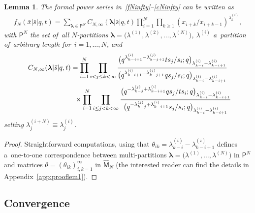 \documentclass[11pt]{article}
\numberwithin{equation}{section}
\newtheorem{Lemma}[Theorem]{Lemma}
\newcommand{\vlam}{\boldsymbol{\lambda}}
\newcommand{\bx}{\bar{x}}
\newcommand{\bs}{\bar{s}}
\begin{document}
\setcounter{section}{3}
\setcounter{subsection}{1}
\setcounter{subsubsection}{0}
\setcounter{Theorem}{4}
\setcounter{equation}{7}
\begin{Lemma}
\label{lem1}
The formal power series in~\eqref{fNinfty}--\eqref{cNinfty} can be written as
\begin{gather}
\label{fNinfty1}
 f_N(\bx|\bs|q,t) = \sum_{\vlam\in\mathsf{P}^N} C_{N,\infty}(\vlam|\bs|q,t) \prod_{i=1}^N\prod_{k\geq 1}(x_{i+k}/x_{i+k-1})^{\lambda^{(i)}_k},
\end{gather}
with $\mathsf{P}^N$ the set of~all $N$-partitions $\vlam=\big(\lambda^{(1)},\lambda^{(2)},\dots,\lambda^{(N)}\big)$, $\lambda^{(i)}$ a~partition of~arbitrary length for~$i=1,\dots,N$, and
\begin{gather}
C_{N,\infty}(\vlam|\bs|q,t) =
\prod_{i=1}^N \prod_{i< j\leq k< \infty}
\frac{\big(q^{\lambda^{(i)}_{k-i+1} - \lambda^{(j)}_{k-j+1}}ts_{j}/s_i;q\big)_{\lambda^{(i)}_{k-i}-\lambda^{(i)}_{k-i+1}}}{\big(q^{\lambda^{(i)}_{k-i+1} - \lambda^{(j)}_{k-j+1}}qs_{j}/s_i;q\big)_{\lambda^{(i)}_{k-i}-\lambda^{(i)}_{k-i+1}}} \nonumber
\\ \hphantom{C_{N,\infty}(\vlam|\bs|q,t) = }
{} \times \prod_{i=1}^N \prod_{i\leq j<k<\infty}
\frac{\big(q^{-\lambda^{(j)}_{k-j}+\lambda^{(i)}_{k-i+1}}qs_{j}/ts_i ;q\big)_{\lambda^{(i)}_{k-i}-\lambda^{(i)}_{k-i+1}}}{\big(q^{-\lambda^{(j)}_{k-j}+\lambda^{(i)}_{k-i+1}}s_{j}/s_i ;q\big)_{\lambda^{(i)}_{k-i}-\lambda^{(i)}_{k-i+1}}}\label{CNinfty}
\end{gather}
setting $\lambda^{(i+N)}_j \equiv \lambda^{(i)}_j$.
\end{Lemma}
\begin{proof}
Straightforward computations, using that $\theta_{ik} = \lambda^{(i)}_{k-i}-\lambda^{(i)}_{k-i+1}$ defines a~one-to-one correspondence between multi-partitions $\vlam=\big(\lambda^{(1)},\dots,\lambda^{(N)}\big)$ in $\mathsf{P}^N$ and matrices $\theta=(\theta_{ik})_{i,k=1}^\infty$ in $\hat{\mathsf{M}}_N$ (the interested reader can find the details in Appendix~\ref{app:prooflem1}).
\end{proof}

\setcounter{section}{3}
\setcounter{subsection}{1}
\setcounter{subsubsection}{0}
\setcounter{Theorem}{6}
\setcounter{equation}{10}
\subsection{Convergence}\label{sec:convergence}
\end{document}
